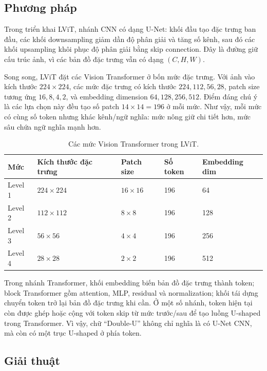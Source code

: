 \subsection*{Phương pháp}

Trong triển khai LViT, nhánh CNN có dạng U-Net: khối đầu tạo đặc trưng ban đầu, các khối downsampling giảm dần độ phân giải và tăng số kênh, sau đó các khối upsampling khôi phục độ phân giải bằng skip connection. Đây là đường giữ cấu trúc ảnh, vì các bản đồ đặc trưng vẫn có dạng \((C,H,W)\).

Song song, LViT đặt các Vision Transformer ở bốn mức đặc trưng. Với ảnh vào kích thước \(224\times224\), các mức đặc trưng có kích thước \(224,112,56,28\), patch size tương ứng \(16,8,4,2\), và embedding dimension \(64,128,256,512\). Điểm đáng chú ý là các lựa chọn này đều tạo số patch \(14\times14=196\) ở mỗi mức. Như vậy, mỗi mức có cùng số token nhưng khác kênh/ngữ nghĩa: mức nông giữ chi tiết hơn, mức sâu chứa ngữ nghĩa mạnh hơn.

\begin{table}[!t]
  \centering
  \caption{Các mức Vision Transformer trong LViT.}
  \label{tab:lvit-vit-levels}
  \scriptsize
  \renewcommand{\arraystretch}{1.12}
  \setlength{\tabcolsep}{5pt}
  \begin{tabularx}{\textwidth}{@{}l Y Y Y Y@{}}
    \toprule
    Mức & Kích thước đặc trưng & Patch size & Số token & Embedding dim \\
    \midrule
    Level 1 & \(224\times224\) & \(16\times16\) & 196 & 64 \\
    Level 2 & \(112\times112\) & \(8\times8\) & 196 & 128 \\
    Level 3 & \(56\times56\) & \(4\times4\) & 196 & 256 \\
    Level 4 & \(28\times28\) & \(2\times2\) & 196 & 512 \\
    \bottomrule
  \end{tabularx}
\end{table}
\FloatBarrier

Trong nhánh Transformer, khối embedding biến bản đồ đặc trưng thành token; block Transformer gồm attention, MLP, residual và normalization; khối tái dựng chuyển token trở lại bản đồ đặc trưng khi cần. Ở một số nhánh, token hiện tại còn được ghép hoặc cộng với token skip từ mức trước/sau để tạo luồng U-shaped trong Transformer. Vì vậy, chữ ``Double-U'' không chỉ nghĩa là có U-Net CNN, mà còn có một trục U-shaped ở phía token.

\subsection*{Giải thuật}

